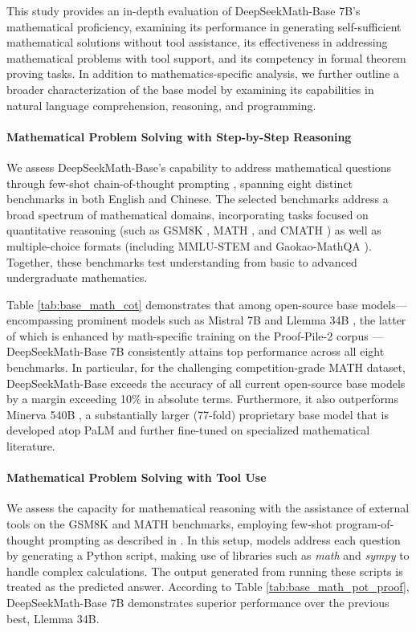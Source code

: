 \begin{itemize}[topsep=0pt]
This study provides an in-depth evaluation of DeepSeekMath-Base 7B's mathematical proficiency, examining its performance in generating self-sufficient mathematical solutions without tool assistance, its effectiveness in addressing mathematical problems with tool support, and its competency in formal theorem proving tasks. In addition to mathematics-specific analysis, we further outline a broader characterization of the base model by examining its capabilities in natural language comprehension, reasoning, and programming.

\paragraph{Mathematical Problem Solving with Step-by-Step Reasoning}

We assess DeepSeekMath-Base’s capability to address mathematical questions through few-shot chain-of-thought prompting \citep{cot}, spanning eight distinct benchmarks in both English and Chinese. The selected benchmarks address a broad spectrum of mathematical domains, incorporating tasks focused on quantitative reasoning (such as GSM8K \citep{gsm8k}, MATH \citep{MATH}, and CMATH \citep{wei2023cmath}) as well as multiple-choice formats (including MMLU-STEM \citep{mmlu} and Gaokao-MathQA \citep{agieval}). Together, these benchmarks test understanding from basic to advanced undergraduate mathematics.

Table \ref{tab:base_math_cot} demonstrates that among open-source base models—encompassing prominent models such as Mistral 7B \citep{mistral} and Llemma 34B \citep{llemma}, the latter of which is enhanced by math-specific training on the Proof-Pile-2 corpus \citep{llemma}—DeepSeekMath-Base 7B consistently attains top performance across all eight benchmarks. In particular, for the challenging competition-grade MATH dataset, DeepSeekMath-Base exceeds the accuracy of all current open-source base models by a margin exceeding 10\% in absolute terms. Furthermore, it also outperforms Minerva 540B \citep{minerva}, a substantially larger (77-fold) proprietary base model that is developed atop PaLM \citep{palm} and further fine-tuned on specialized mathematical literature.

\paragraph{Mathematical Problem Solving with Tool Use} We assess the capacity for mathematical reasoning with the assistance of external tools on the GSM8K and MATH benchmarks, employing few-shot program-of-thought prompting as described in \citep{pot,pal}. In this setup, models address each question by generating a Python script, making use of libraries such as \textit{math} and \textit{sympy} to handle complex calculations. The output generated from running these scripts is treated as the predicted answer. According to Table \ref{tab:base_math_pot_proof}, DeepSeekMath-Base 7B demonstrates superior performance over the previous best, Llemma 34B.


\end{itemize}
